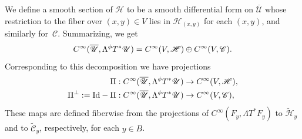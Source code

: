 \documentclass[11pt]{article}
\numberwithin{equation}{section}
\theoremstyle{plain}
\theoremstyle{definition}
\newcommand{\Umathbar}{{\overline{\mathscr{U}}}}
\newcommand{\Cinf}{C^\infty}
\newcommand{\phiT}{{}^\phi T}
\begin{document}
We define a smooth section of $\mathscr{H}$ to be a smooth differential form on $\overline{\mathscr{U}}$ whose restric\-tion to the fiber over $(x,y)\in V$ lies in $\mathscr{H}_{(x,y)}$ for each $(x,y)$, and similarly for~$\mathscr{C}$. Summarizing, we get
\begin{equation}
\label{eqn:Cinf decomp}
\Cinf(\Umathbar,\Lambda \phiT^*\U) = \Cinf(V, \mathscr{H}) \oplus \Cinf(V,\mathscr{C}).
\end{equation}
Corresponding to this decomposition we have projections
\begin{equation}\label{projections-def}
\begin{split}
\Pi: \Cinf(\Umathbar,\Lambda \phiT^*\U) &\to \Cinf(V, \mathscr{H}), \\
\Pi^{\perp} := \text{Id} - \Pi: \Cinf(\Umathbar,\Lambda \phiT^*\U) &\to \Cinf(V,\mathscr{C}),
\end{split}
\end{equation}
These maps are defined fiberwise from the projections of $\Cinf(F_y,\Lambda T^*F_y)$ to $\widetilde{\mathscr{H}}_y$ and to $\widetilde{\mathscr{C}}_y$, respectively, for each $y \in B$.
\end{document}
